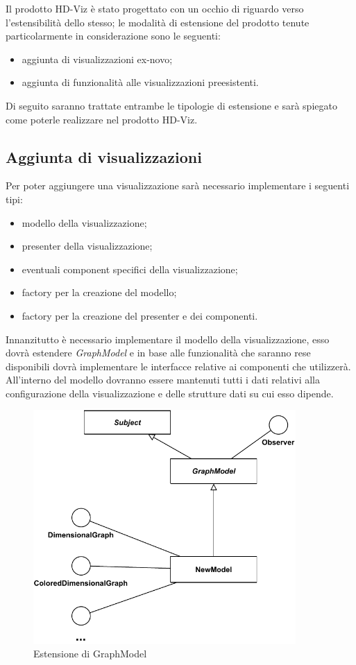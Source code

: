 \documentclass[../manuale_sviluppatore.tex]{subfiles}
\begin{document}
Il prodotto HD-Viz è stato progettato con un occhio di riguardo verso l'estensibilità dello stesso; 
le modalità di estensione del prodotto tenute particolarmente in considerazione sono le seguenti:
\begin{itemize}
	\item aggiunta di visualizzazioni ex-novo;
	\item aggiunta di funzionalità alle visualizzazioni preesistenti.
\end{itemize}
Di seguito saranno trattate entrambe le tipologie di estensione e sarà spiegato come poterle 
realizzare nel prodotto HD-Viz.

\subsection{Aggiunta di visualizzazioni}
Per poter aggiungere una visualizzazione sarà necessario implementare i seguenti tipi:
\begin{itemize}
	\item modello della visualizzazione;
	\item presenter della visualizzazione;
	\item eventuali component specifici della visualizzazione;
	\item factory per la creazione del modello;
	\item factory per la creazione del presenter e dei componenti.
\end{itemize}

Innanzitutto è necessario implementare il modello della visualizzazione, esso dovrà estendere 
\emph{GraphModel} e in base alle funzionalità che saranno rese disponibili dovrà implementare le 
interfacce relative ai componenti che utilizzerà. All'interno del modello dovranno essere mantenuti 
tutti i dati relativi alla configurazione della visualizzazione e delle strutture dati su cui esso 
dipende.

\begin{figure}[H]
	\centering
	\includegraphics[width=10cm]{img/extendModel.pdf}
	\caption{Estensione di GraphModel}
\end{figure}
\end{document}
